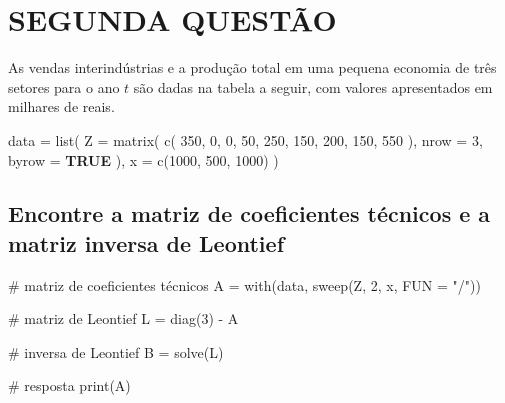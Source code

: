 \documentclass[
  letterpaper,
  DIV=11,
  numbers=noendperiod]{scrreprt}
\newenvironment{Shaded}{\begin{snugshade}}{\end{snugshade}}
\newcommand{\AttributeTok}[1]{\textcolor[rgb]{0.80,0.80,0.80}{#1}}
\newcommand{\CommentTok}[1]{\textcolor[rgb]{0.50,0.62,0.50}{#1}}
\newcommand{\ConstantTok}[1]{\textcolor[rgb]{0.86,0.64,0.64}{\textbf{#1}}}
\newcommand{\DecValTok}[1]{\textcolor[rgb]{0.86,0.86,0.80}{#1}}
\newcommand{\FunctionTok}[1]{\textcolor[rgb]{0.94,0.94,0.56}{#1}}
\newcommand{\NormalTok}[1]{\textcolor[rgb]{0.80,0.80,0.80}{#1}}
\newcommand{\OtherTok}[1]{\textcolor[rgb]{0.94,0.94,0.56}{#1}}
\newcommand{\SpecialCharTok}[1]{\textcolor[rgb]{0.86,0.64,0.64}{#1}}
\newcommand{\StringTok}[1]{\textcolor[rgb]{0.80,0.58,0.58}{#1}}
\begin{document}
\chapter{SEGUNDA QUESTÃO}\label{segunda-questuxe3o}

As vendas interindústrias e a produção total em uma pequena economia de
três setores para o ano \(t\) são dadas na tabela a seguir, com valores
apresentados em milhares de reais.

\begin{Shaded}
\begin{Highlighting}[numbers=left,,]
\NormalTok{data }\OtherTok{=} \FunctionTok{list}\NormalTok{(}
  \AttributeTok{Z =} \FunctionTok{matrix}\NormalTok{(}
    \FunctionTok{c}\NormalTok{(}
      \DecValTok{350}\NormalTok{, }\DecValTok{0}\NormalTok{, }\DecValTok{0}\NormalTok{,}
      \DecValTok{50}\NormalTok{, }\DecValTok{250}\NormalTok{, }\DecValTok{150}\NormalTok{,}
      \DecValTok{200}\NormalTok{, }\DecValTok{150}\NormalTok{, }\DecValTok{550}
\NormalTok{      ),}
    \AttributeTok{nrow =} \DecValTok{3}\NormalTok{,}
    \AttributeTok{byrow =} \ConstantTok{TRUE}
\NormalTok{  ),}
  \AttributeTok{x =} \FunctionTok{c}\NormalTok{(}\DecValTok{1000}\NormalTok{, }\DecValTok{500}\NormalTok{, }\DecValTok{1000}\NormalTok{)}
\NormalTok{)}
\end{Highlighting}
\end{Shaded}

\section{Encontre a matriz de coeficientes técnicos e a matriz inversa
de
Leontief}\label{encontre-a-matriz-de-coeficientes-tuxe9cnicos-e-a-matriz-inversa-de-leontief}

\begin{Shaded}
\begin{Highlighting}[numbers=left,,]
\CommentTok{\# matriz de coeficientes técnicos}
\NormalTok{A }\OtherTok{=} \FunctionTok{with}\NormalTok{(data, }\FunctionTok{sweep}\NormalTok{(Z, }\DecValTok{2}\NormalTok{, x, }\AttributeTok{FUN =} \StringTok{"/"}\NormalTok{))}

\CommentTok{\# matriz de Leontief}
\NormalTok{L }\OtherTok{=} \FunctionTok{diag}\NormalTok{(}\DecValTok{3}\NormalTok{) }\SpecialCharTok{{-}}\NormalTok{ A}

\CommentTok{\# inversa de Leontief}
\NormalTok{B }\OtherTok{=} \FunctionTok{solve}\NormalTok{(L)}

\CommentTok{\# resposta}
\FunctionTok{print}\NormalTok{(A)}
\end{Highlighting}
\end{Shaded}
\end{document}
